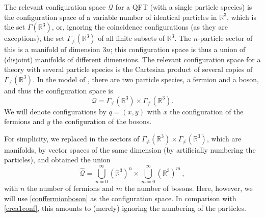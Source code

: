 \documentclass[12pt]{article}
\newcommand{\RRR}{\mathbb{R}} %
\newcommand{\1}{\mathbf{1}} %
\newcommand{\conf}{\mathcal{Q}} %
\newcommand{\Gommo}{\Gamma_{\!\neq}} %
\begin{document}
The relevant configuration space $\conf$ for a QFT (with a single
particle species) is the configuration space of a variable number of
identical particles in $\RRR^3$, which is the set $\Gamma(\RRR^3)$,
or, ignoring the coincidence configurations (as they are exceptions),
the set $\Gommo (\RRR^3)$ of all finite subsets of $\RRR^3$. The
$n$-particle sector of this is a manifold of dimension $3n$; this
configuration space is thus a union of (disjoint) manifolds of
different dimensions. The relevant configuration space for a theory
with several particle species is the Cartesian product of several
copies of $\Gommo (\RRR^3)$.  In the model of \cite{crea1}, there are
two particle species, a fermion and a boson, and thus the
configuration space is
\begin{equation}\label{conffermionboson}
   \conf = \Gommo (\RRR^3) \times \Gommo (\RRR^3).
\end{equation}
We will denote configurations by $q=(x,y)$ with $x$ the configuration
of the fermions and $y$ the configuration of the bosons.

For simplicity, we replaced in \cite{crea1} the sectors of $\Gommo
(\RRR^3) \times \Gommo (\RRR^3)$, which are manifolds, by vector
spaces of the same dimension (by artificially numbering the
particles), and obtained the union
\begin{equation}\label{crea1conf}
   \hat{\conf} = \bigcup_{n=0}^\infty (\RRR^3)^n \times
   \bigcup_{m=0}^\infty (\RRR^3)^m \,,
\end{equation}
with $n$ the number of fermions and $m$ the number of bosons. Here,
however, we will use \eqref{conffermionboson} as the configuration
space.  In comparison with \eqref{crea1conf}, this amounts to (merely)
ignoring the numbering of the particles.
\end{document}
